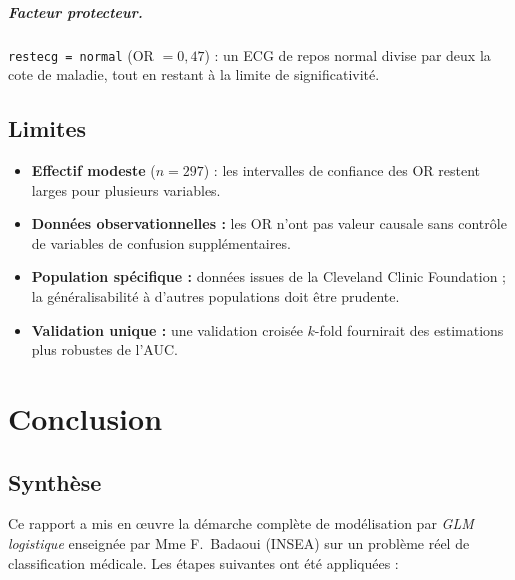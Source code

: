 \documentclass[11pt,a4paper,twoside]{report}
\theoremstyle{definition}
\begin{document}
\paragraph{Facteur protecteur.}
\texttt{restecg = normal} (OR $= 0{,}47$) : un ECG de repos normal
divise par deux la cote de maladie, tout en restant à la limite de
significativité.

\section{Limites}

\begin{itemize}\itemsep0.2em
  \item \textbf{Effectif modeste} ($n = 297$) : les intervalles de
    confiance des OR restent larges pour plusieurs variables.
  \item \textbf{Données observationnelles :} les OR n'ont pas valeur
    causale sans contrôle de variables de confusion supplémentaires.
  \item \textbf{Population spécifique :} données issues de la
    Cleveland Clinic Foundation ; la généralisabilité à d'autres
    populations doit être prudente.
  \item \textbf{Validation unique :} une validation croisée $k$-fold
    fournirait des estimations plus robustes de l'AUC.
\end{itemize}

\chapter{Conclusion}

\section{Synthèse}

Ce rapport a mis en \oe uvre la démarche complète de modélisation par
\emph{GLM logistique} enseignée par Mme F.\ Badaoui (INSEA) sur un
problème réel de classification médicale. Les étapes suivantes ont été
appliquées :
\end{document}

